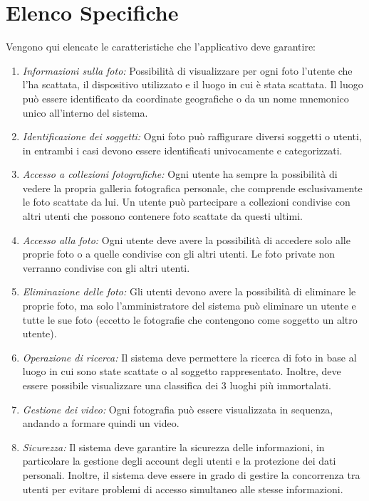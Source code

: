\documentclass[a4paper,12pt,oneside]{book}
\begin{document}
    \section{Elenco Specifiche}
   Vengono qui elencate le caratteristiche che l'applicativo deve garantire:
    \begin{enumerate}
        \item \emph{Informazioni sulla foto:} Possibilità di visualizzare per ogni foto l'utente che l'ha scattata, il dispositivo utilizzato e il luogo in cui è stata scattata. Il luogo può essere identificato da coordinate geografiche o da un nome mnemonico unico all'interno del sistema.
        
        \item \emph{Identificazione dei soggetti:} Ogni foto può raffigurare diversi soggetti o utenti, in entrambi i casi devono essere identificati univocamente e categorizzati.

        \item \emph{Accesso a collezioni fotografiche:} Ogni utente ha sempre la possibilità di vedere la propria galleria fotografica personale, che comprende esclusivamente le foto scattate da lui. Un utente può partecipare a collezioni condivise con altri utenti che possono contenere foto scattate da questi ultimi. 
        
         \item \emph{Accesso alla foto:} Ogni utente deve avere la possibilità di accedere solo alle proprie foto o a quelle condivise con gli altri utenti. Le foto private non verranno condivise con gli altri utenti.
         
        \item \emph{Eliminazione delle foto:} Gli utenti devono avere la possibilità di eliminare le proprie foto, ma solo l'amministratore del sistema può eliminare un utente e tutte le sue foto (eccetto le fotografie che contengono come soggetto un altro utente).

        \item \emph{Operazione di ricerca:} Il sistema deve permettere la ricerca di foto in base al luogo in cui sono state scattate o al soggetto rappresentato. Inoltre, deve essere possibile visualizzare una classifica dei 3 luoghi più immortalati.
        \item \emph{Gestione dei video:} Ogni fotografia può essere visualizzata in sequenza, andando a formare quindi un video. %

        \item \emph{Sicurezza:} Il sistema deve garantire la sicurezza delle informazioni, in particolare la gestione degli account degli utenti e la protezione dei dati personali. Inoltre, il sistema deve essere in grado di gestire la concorrenza tra utenti per evitare problemi di accesso simultaneo alle stesse informazioni.
    \end{enumerate}
    \par
    
\end{document}
